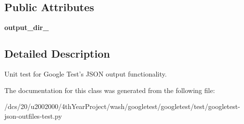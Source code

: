 \subsection*{Public Attributes}
\begin{DoxyCompactItemize}
\item 
\mbox{\label{classgoogletest-json-outfiles-test_1_1GTestJsonOutFilesTest_a18e262639002fb485155961593efad20}} 
{\bfseries output\+\_\+dir\+\_\+}
\end{DoxyCompactItemize}


\subsection{Detailed Description}
\begin{DoxyVerb}Unit test for Google Test's JSON output functionality.\end{DoxyVerb}
 

The documentation for this class was generated from the following file\+:\begin{DoxyCompactItemize}
\item 
/dcs/20/u2002000/4th\+Year\+Project/wash/googletest/googletest/test/googletest-\/json-\/outfiles-\/test.\+py\end{DoxyCompactItemize}
